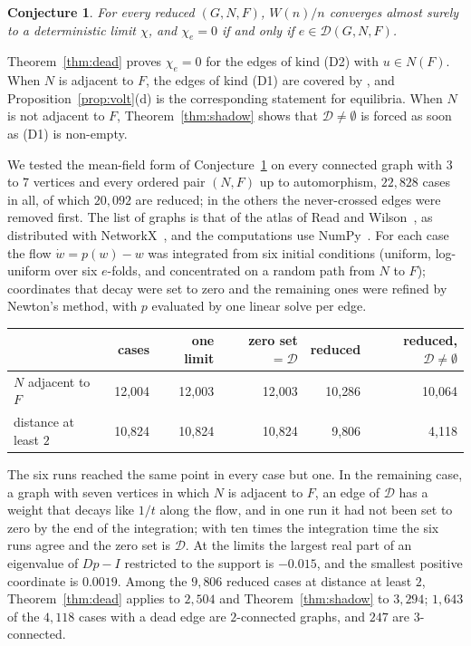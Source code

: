 \documentclass[11pt]{amsart}
\newtheorem{conjecture}[theorem]{Conjecture}
\theoremstyle{remark}
\begin{document}
\begin{conjecture}\label{conj:new}
For every reduced $(G,N,F)$, $W(n)/n$ converges almost surely to a deterministic limit $\chi$, and $\chi_e=0$ if and
only if $e\in\mathcal D(G,N,F)$.
\end{conjecture}

Theorem~\ref{thm:dead} proves $\chi_e=0$ for the edges of kind (D2) with $u\in N(F)$. When $N$ is adjacent to $F$,
the edges of kind (D1) are covered by \cite[Proposition 2.8]{KMS}, and Proposition~\ref{prop:volt}(d) is the
corresponding statement for equilibria. When $N$ is not adjacent to $F$, Theorem~\ref{thm:shadow} shows that
$\mathcal D\neq\emptyset$ is forced as soon as (D1) is non-empty.

We tested the mean-field form of Conjecture~\ref{conj:new} on every connected graph with $3$ to $7$ vertices and
every ordered pair $(N,F)$ up to automorphism, $22{,}828$ cases in all, of which $20{,}092$ are reduced; in the others the
never-crossed edges were removed first. The list of graphs is that of the atlas of Read and Wilson~\cite{Atlas}, as
distributed with NetworkX~\cite{NetworkX}, and the computations use NumPy~\cite{NumPy}. For each case the flow $\dot w=p(w)-w$ was integrated from six initial
conditions (uniform, log-uniform over six $e$-folds, and concentrated on a random path from $N$ to $F$); coordinates
that decay were set to zero and the remaining ones were refined by Newton's method, with $p$ evaluated by one linear
solve per edge.
\begin{center}
\begin{tabular}{lrrrrr}
\toprule
 & cases & one limit & zero set $=\mathcal D$ & reduced & reduced, $\mathcal D\neq\emptyset$\\
\midrule
$N$ adjacent to $F$ & 12{,}004 & 12{,}003 & 12{,}003 & 10{,}286 & 10{,}064\\
distance at least $2$ & 10{,}824 & 10{,}824 & 10{,}824 & 9{,}806 & 4{,}118\\
\bottomrule
\end{tabular}
\end{center}
The six runs reached the same point in every case but one. In the remaining case, a graph with seven vertices in which
$N$ is adjacent to $F$, an edge of $\mathcal D$ has a weight that decays like $1/t$ along the flow, and in one run it had
not been set to zero by the end of the integration; with ten times the integration time the six runs agree and the
zero set is $\mathcal D$. At the limits the largest real part of an eigenvalue of
$Dp-I$ restricted to the support is $-0.015$, and the smallest positive coordinate is $0.0019$. Among the $9{,}806$
reduced cases at distance at least $2$, Theorem~\ref{thm:dead} applies to $2{,}504$ and Theorem~\ref{thm:shadow} to
$3{,}294$; $1{,}643$ of the $4{,}118$ cases with a dead edge are $2$-connected graphs, and $247$ are $3$-connected.
\end{document}
